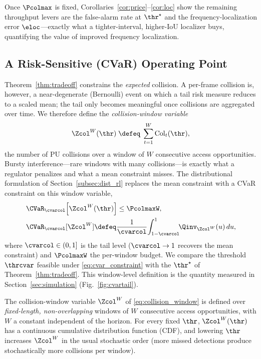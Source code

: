 \begin{remark}
Once $\Pcolmax$ is fixed, Corollaries~\ref{cor:price}--\ref{cor:loc} show the
remaining throughput levers are the false-alarm rate at $\thr^{\star}$ and the
frequency-localization error $\eloc$---exactly what a tighter-interval,
higher-IoU localizer buys, quantifying the value of improved frequency
localization.
\end{remark}

\subsection{A Risk-Sensitive (CVaR) Operating Point}
\label{subsec:thmD}
Theorem~\ref{thm:tradeoff} constrains the \emph{expected} collision. A
per-frame collision is, however, a near-degenerate (Bernoulli) event on which
a tail risk measure reduces to a scaled mean; the tail only becomes
meaningful once collisions are aggregated over time. We therefore define the
\emph{collision-window variable}
\begin{equation}
\Zcol^{W}(\thr)\;\defeq\;\sum_{t=1}^{W}\mathrm{Col}_t(\thr),
\label{eq:collision_window}
\end{equation}
the number of PU collisions over a window of $W$ consecutive access
opportunities. Bursty interference---rare windows with many collisions---is
exactly what a regulator penalizes and what a mean constraint misses. The
distributional formulation of Section~\ref{subsec:dist_rl} replaces the mean
constraint with a CVaR constraint on this window
variable,
\begin{equation}
\begin{aligned}
&\CVaR_{\cvarcol}\!\left[\Zcol^{W}(\thr)\right]\le\PcolmaxW,\\
&\CVaR_{\cvarcol}[\Zcol^{W}]\defeq\frac{1}{\cvarcol}\!\int_{1-\cvarcol}^{1}\!\!
\Qinv_{\Zcol^{W}}(u)\,du,
\end{aligned}
\label{eq:cvar_constraint}
\end{equation}
where $\cvarcol\in(0,1]$ is the tail level ($\cvarcol\to1$ recovers the mean
constraint) and $\PcolmaxW$ the per-window budget. We compare the threshold
$\thrcvar$ feasible under \eqref{eq:cvar_constraint} with the $\thr^{\star}$
of Theorem~\ref{thm:tradeoff}. This window-level definition is the quantity
measured in Section~\ref{sec:simulation} (Fig.~\ref{fig:cvartail}).

\begin{assumption}
\label{as:tailmono}
The collision-window variable $\Zcol^{W}$ of \eqref{eq:collision_window} is
defined over \emph{fixed-length, non-overlapping} windows of $W$ consecutive
access opportunities, with $W$ a constant independent of the horizon. For
every fixed $\thr$, $\Zcol^{W}(\thr)$ has a continuous cumulative
distribution function (CDF), and lowering
$\thr$ increases $\Zcol^{W}$ in the usual stochastic order (more missed
detections produce stochastically more collisions per window).
\end{assumption}

